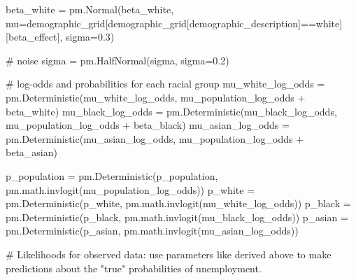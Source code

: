 \documentclass[
]{agujournal2019}
\newenvironment{Shaded}{\begin{snugshade}}{\end{snugshade}}
\newcommand{\CommentTok}[1]{\textcolor[rgb]{0.37,0.37,0.37}{#1}}
\newcommand{\FloatTok}[1]{\textcolor[rgb]{0.68,0.00,0.00}{#1}}
\newcommand{\NormalTok}[1]{\textcolor[rgb]{0.00,0.23,0.31}{#1}}
\newcommand{\OperatorTok}[1]{\textcolor[rgb]{0.37,0.37,0.37}{#1}}
\newcommand{\StringTok}[1]{\textcolor[rgb]{0.13,0.47,0.30}{#1}}
\begin{document}
\begin{Shaded}
\begin{Highlighting}[]
\NormalTok{    beta\_white }\OperatorTok{=}\NormalTok{ pm.Normal(}\StringTok{\textquotesingle{}beta\_white\textquotesingle{}}\NormalTok{, mu}\OperatorTok{=}\NormalTok{demographic\_grid[demographic\_grid[}\StringTok{\textquotesingle{}demographic\_description\textquotesingle{}}\NormalTok{]}\OperatorTok{==}\StringTok{\textquotesingle{}white\textquotesingle{}}\NormalTok{][}\StringTok{\textquotesingle{}beta\_effect\textquotesingle{}}\NormalTok{], sigma}\OperatorTok{=}\FloatTok{0.3}\NormalTok{) }
    
    \CommentTok{\# noise}
\NormalTok{    sigma }\OperatorTok{=}\NormalTok{ pm.HalfNormal(}\StringTok{\textquotesingle{}sigma\textquotesingle{}}\NormalTok{, sigma}\OperatorTok{=}\FloatTok{0.2}\NormalTok{)}

    \CommentTok{\# log{-}odds and probabilities for each racial group}
\NormalTok{    mu\_white\_log\_odds }\OperatorTok{=}\NormalTok{ pm.Deterministic(}\StringTok{\textquotesingle{}mu\_white\_log\_odds\textquotesingle{}}\NormalTok{, mu\_population\_log\_odds }\OperatorTok{+}\NormalTok{ beta\_white)}
\NormalTok{    mu\_black\_log\_odds }\OperatorTok{=}\NormalTok{ pm.Deterministic(}\StringTok{\textquotesingle{}mu\_black\_log\_odds\textquotesingle{}}\NormalTok{, mu\_population\_log\_odds }\OperatorTok{+}\NormalTok{ beta\_black)}
\NormalTok{    mu\_asian\_log\_odds }\OperatorTok{=}\NormalTok{ pm.Deterministic(}\StringTok{\textquotesingle{}mu\_asian\_log\_odds\textquotesingle{}}\NormalTok{, mu\_population\_log\_odds }\OperatorTok{+}\NormalTok{ beta\_asian)}

\NormalTok{    p\_population }\OperatorTok{=}\NormalTok{ pm.Deterministic(}\StringTok{\textquotesingle{}p\_population\textquotesingle{}}\NormalTok{, pm.math.invlogit(mu\_population\_log\_odds))}
\NormalTok{    p\_white }\OperatorTok{=}\NormalTok{ pm.Deterministic(}\StringTok{\textquotesingle{}p\_white\textquotesingle{}}\NormalTok{, pm.math.invlogit(mu\_white\_log\_odds))}
\NormalTok{    p\_black }\OperatorTok{=}\NormalTok{ pm.Deterministic(}\StringTok{\textquotesingle{}p\_black\textquotesingle{}}\NormalTok{, pm.math.invlogit(mu\_black\_log\_odds))}
\NormalTok{    p\_asian }\OperatorTok{=}\NormalTok{ pm.Deterministic(}\StringTok{\textquotesingle{}p\_asian\textquotesingle{}}\NormalTok{, pm.math.invlogit(mu\_asian\_log\_odds))}

    \CommentTok{\# Likelihoods for observed data: use parameters like derived above to make predictions about the "true" probabilities of unemployment.}


\end{Highlighting}
\end{Shaded}
\end{document}
